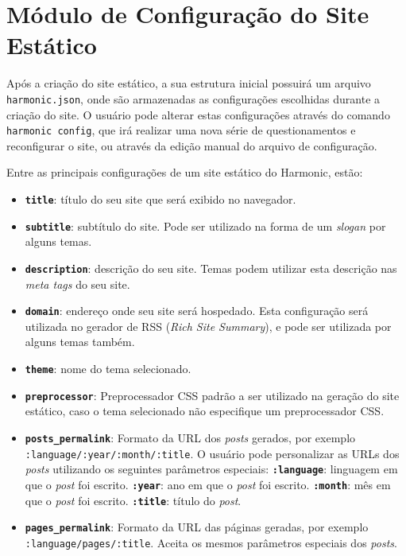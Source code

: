 \documentclass[ppginf, pep]{esinucpel}
\newcommand{\code}[1]{\texttt{#1}}
\begin{document}
\section{Módulo de Configuração do Site Estático}

Após a criação do site estático, a sua estrutura inicial possuirá um arquivo \code{harmonic.json}, onde são armazenadas as configurações escolhidas durante a criação do site. O usuário pode alterar estas configurações através do comando \code{harmonic config}, que irá realizar uma nova série de questionamentos e reconfigurar o site, ou através da edição manual do arquivo de configuração.

Entre as principais configurações de um site estático do Harmonic, estão:

\begin{itemize}
	\item \textbf{\code{title}}: título do seu site que será exibido no navegador.
	\item \textbf{\code{subtitle}}: subtítulo do site. Pode ser utilizado na forma de um \textit{slogan} por alguns temas.
	\item \textbf{\code{description}}: descrição do seu site. Temas podem utilizar esta descrição nas \textit{meta tags} do seu site.
    \item \textbf{\code{domain}}: endereço onde seu site será hospedado. Esta configuração será utilizada no gerador de RSS (\textit{Rich Site Summary}), e pode ser utilizada por alguns temas também.
    \item \textbf{\code{theme}}: nome do tema selecionado.
    \item \textbf{\code{preprocessor}}: Preprocessador CSS padrão a ser utilizado na geração do site estático, caso o tema selecionado não especifique um preprocessador CSS.
    \item \textbf{\code{posts\_permalink}}: Formato da URL dos \textit{posts} gerados, por exemplo \code{:language/:year/:month/:title}. O usuário pode personalizar as URLs dos \textit{posts} utilizando os seguintes parâmetros especiais:
        \subitem \textbf{\code{:language}}: linguagem em que o \textit{post} foi escrito.
        \subitem \textbf{\code{:year}}: ano em que o \textit{post} foi escrito.
        \subitem \textbf{\code{:month}}: mês em que o \textit{post} foi escrito.
        \subitem \textbf{\code{:title}}: título do \textit{post}.
    \item \textbf{\code{pages\_permalink}}: Formato da URL das páginas geradas, por exemplo \code{:language/pages/:title}. Aceita os mesmos parâmetros especiais dos \textit{posts}.

\end{itemize}
\end{document}
